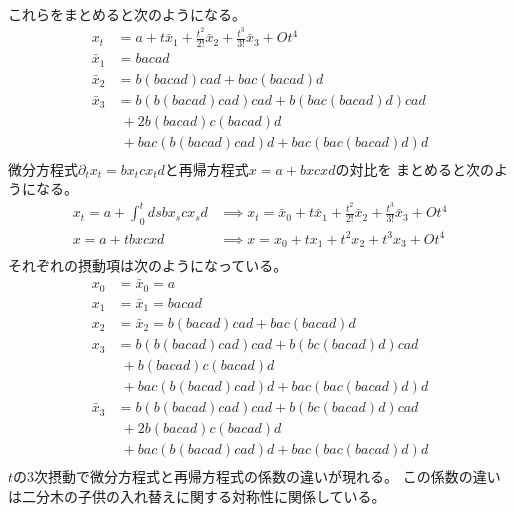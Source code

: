 {\begin{equation*}
\begin{split}
	\end{split}\end{equation*}
	これらをまとめると次のようになる。
	\begin{equation*}\begin{split}
		x_t &= a + t\bar{x}_1 + \frac{t^2}{2!}\bar{x}_2 
			+ \frac{t^3}{3!}\bar{x}_3 + Ot^4 \\
		\bar{x}_1 &= bacad \\
		\bar{x}_2 &= b(bacad)cad + bac(bacad)d \\
		\bar{x}_3 &= b(b(bacad)cad)cad + b(bac(bacad)d)cad \\
		&\;+ 2b(bacad)c(bacad)d \\
		&\;+ bac(b(bacad)cad)d + bac(bac(bacad)d)d  \\
	\end{split}\end{equation*}
	微分方程式$\partial_tx_t=bx_tcx_td$と再帰方程式$x=a+bxcxd$の対比を
	まとめると次のようになる。
	\begin{equation*}\begin{split}
		x_t = a + \int_0^tds bx_scx_sd
		&\implies x_t = \bar{x}_0 + t\bar{x}_1 + \frac{t^2}{2!}\bar{x}_2 
			+ \frac{t^3}{3!}\bar{x}_3 + Ot^4 \\ 
		x = a + tbxcxd
		&\implies x = x_0 + tx_1 + t^2x_2 + t^3x_3 + Ot^4 \\ 
	\end{split}\end{equation*}
	それぞれの摂動項は次のようになっている。
	\begin{equation*}\begin{split}
		x_0 &= \bar{x}_0 = a \\
		x_1 &= \bar{x}_1 = bacad \\
		x_2 &= \bar{x}_2 = b(bacad)cad + bac(bacad)d \\
		x_3 &= b(b(bacad)cad)cad + b(bc(bacad)d)cad \\
		&\;+ b(bacad)c(bacad)d \\
		&\;+ bac(b(bacad)cad)d + bac(bac(bacad)d)d \\
		\bar{x}_3 &= b(b(bacad)cad)cad + b(bc(bacad)d)cad \\
		&\;+ 2b(bacad)c(bacad)d \\
		&\;+ bac(b(bacad)cad)d + bac(bac(bacad)d)d \\
	\end{split}\end{equation*}
	$t$の3次摂動で微分方程式と再帰方程式の係数の違いが現れる。
	この係数の違いは二分木の子供の入れ替えに関する対称性に関係している。
}
